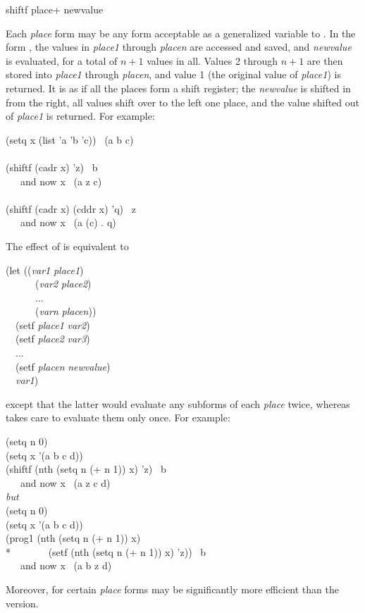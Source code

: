 \begin{defmac}
shiftf {place}+ newvalue

Each \textit{place} form may be any form acceptable
as a generalized variable to .
In the form ,
the values in \textit{place1} through \textit{placen} are accessed and saved,
and \textit{newvalue} is evaluated, for a total of $\textit{n}+1$ values in all.
Values 2 through $\textit{n}+1$ are then stored into \textit{place1} through \textit{placen},
and value 1 (the original value of \textit{place1}) is returned.
It is as if all the places form a shift register; the \textit{newvalue}
is shifted in from the right, all values shift over to the left one place,
and the value shifted out of \textit{place1} is returned.  For example:
\begin{lisp}
(setq x (list 'a 'b 'c)) \EV\ (a b c) \\
 \\
(shiftf (cadr x) 'z) \EV\ b \\
~~~\textrm{and now} x \EV\ (a z c) \\
 \\
(shiftf (cadr x) (cddr x) 'q) \EV\ z \\
~~~\textrm{and now} x \EV\ (a (c) . q)
\end{lisp}
The effect of 
is equivalent to
\begin{lisp}
(let ((\textit{var1} \textit{place1}) \\
~~~~~~(\textit{var2} \textit{place2}) \\
~~~~~~... \\
~~~~~~(\textit{varn} \textit{placen})) \\
~~(setf \textit{place1} \textit{var2}) \\
~~(setf \textit{place2} \textit{var3}) \\
~~... \\
~~(setf \textit{placen} \textit{newvalue}) \\
~~\textit{var1})
\end{lisp}
except that the latter would evaluate any subforms of each \textit{place} twice,
whereas  takes care to evaluate them only once.
For example:
\begin{lisp}
(setq n 0) \\
(setq x '(a b c d)) \\
(shiftf (nth (setq n (+ n 1)) x) 'z) \EV\ b \\
~~~\textrm{and now} x \EV\ (a z c d) \\[4pt]
\textit{but} \\[4pt]
(setq n 0) \\
(setq x '(a b c d)) \\
(prog1 (nth (setq n (+ n 1)) x) \\*
~~~~~~~(setf (nth (setq n (+ n 1)) x) 'z)) \EV\ b \\
~~~\textrm{and now} x \EV\ (a b z d)
\end{lisp}
Moreover, for certain \textit{place} forms  may be
significantly more efficient than the  version.


\end{defmac}
